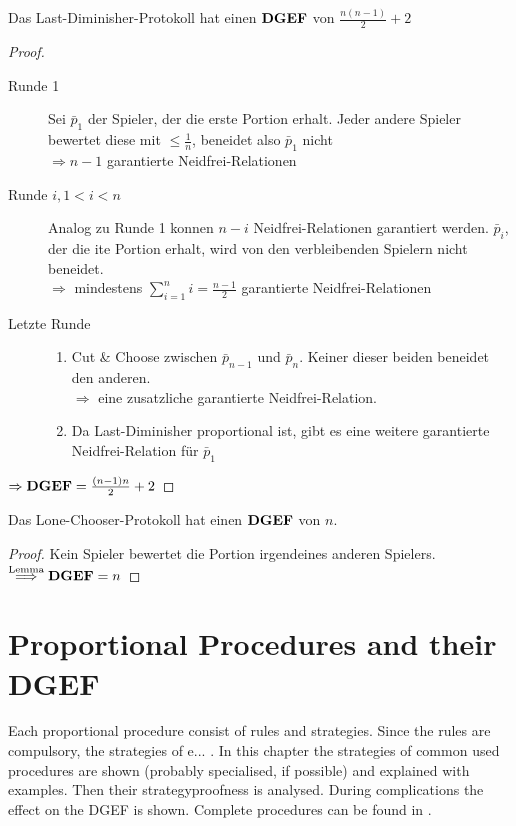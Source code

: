 \begin{satz}
 Das Last-Diminisher-Protokoll hat einen $\text{\textbf{DGEF}}$ von $\frac{n(n-1)}{2}+2$
\end{satz}
\begin{proof}
 \begin{description}
  \item[Runde 1] Sei $\bar{p}_1$ der Spieler, der die erste Portion erhalt. Jeder andere Spieler bewertet diese mit $\leq\frac{1}{n}$,
                 beneidet also $\bar{p}_1$ nicht\\$\Rightarrow n-1$ garantierte Neidfrei-Relationen
  \item[Runde $i, 1<i<n$] Analog zu Runde 1 konnen $n-i$ Neidfrei-Relationen garantiert werden. $\bar{p}_i$, der die ite Portion erhalt, wird
                          von den verbleibenden Spielern nicht beneidet.\\$\Rightarrow$ mindestens $\sum\limits_{i=1}^ni=\frac{n-1}{2}$
                          garantierte Neidfrei-Relationen
  \item[Letzte Runde] \begin{enumerate}
                       \item Cut \& Choose zwischen $\bar{p}_{n-1}$ und $\bar{p}_n$. Keiner dieser beiden beneidet den anderen.\\
                             $\Rightarrow$ eine zusatzliche garantierte Neidfrei-Relation.
                       \item Da Last-Diminisher proportional ist, gibt es eine weitere garantierte Neidfrei-Relation für $\bar{p}_1$
                      \end{enumerate}
 \end{description}
$\Rightarrow\text{\textbf{DGEF}}=\frac{(n-1)n}{2}+2$ 
\end{proof}
\begin{satz}
 Das Lone-Chooser-Protokoll hat einen $\text{\textbf{DGEF}}$ von $n$.
\end{satz}
\begin{proof}
 Kein Spieler bewertet die Portion irgendeines anderen Spielers.\\$\stackrel{\text{Lemma}}{\Longrightarrow}\text{\textbf{DGEF}}=n$
\end{proof}


\pagebreak

\section{Proportional Procedures and their DGEF}
Each proportional procedure consist of rules and strategies. Since the rules are compulsory, the strategies of e... . In this chapter the strategies of common used procedures are shown (probably specialised, if possible) and explained with examples. Then their strategyproofness is analysed. During complications the effect on the DGEF is shown. Complete procedures can be found in \cite{}.
